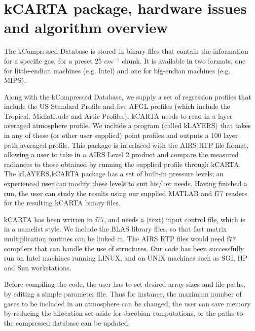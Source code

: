 \documentclass[11pt]{article}
\begin{document}
\section{\textsf{kCARTA} package, hardware issues and algorithm overview}

The kCompressed Database is stored in binary files that contain 
the information for a specific gas, for a preset 25 $cm^{-1}$ chunk.  It is 
available in two formats, one for little-endian machines (e.g. Intel) and one 
for big-endian machines (e.g. MIPS). 

Along with the kCompressed Database, we supply a set of regression profiles 
that include the US Standard Profile and five AFGL profiles (which include
the Tropical, Midlatitude and Artic Profiles).  
\textsf{kCARTA} needs to read in a layer averaged atmosphere profile. We 
include a program (called \textsf{kLAYERS}) that takes in any of these (or 
other user supplied) point profiles and outputs a 100 layer path averaged 
profile. This package is interfaced with the \textsf{AIRS RTP} file format, 
allowing a user to take in a \textsf{AIRS Level 2} product and compare 
the measured radiances to those obtained by running the supplied profile 
through \textsf{kCARTA}. The \textsf{kLAYERS,kCARTA} package has a set of 
built-in pressure levels; an experienced user can modify these levels to suit
his/her needs. Having finished a run, the user can study the results using
our supplied \textsf{MATLAB} and f77 readers for the resulting 
\textsf{kCARTA} binary files. 

\textsf{kCARTA} has been written in f77, and needs a (text) input control file,
which is in a namelist style.  We include the \textsf{BLAS} library files, so 
that fast matrix multiplication routines can be linked in. The 
\textsf{AIRS RTP} files would need f77 compilers that can handle the use of 
structures. Our code has been successfully run on Intel machines running 
LINUX, and on UNIX machines such as SGI, HP and Sun workstations.

Before compiling the code, the user has to set desired array sizes and 
file paths, by editing a simple parameter file. Thus for instance, 
the maximum number of gases 
to be included in an atmosphere can be changed, the user can save memory by 
reducing the allocation set aside for Jacobian computations, or the paths 
to the compressed database can be updated.
\end{document}
